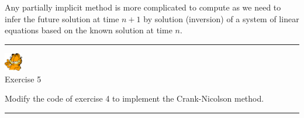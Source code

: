Any partially implicit method is more complicated to compute as we need to infer the future solution 
at time $n+1$ by solution (inversion) of a system of linear equations based on the known solution at time $n$. 

\begin{center}

\end{center}

\begin{center}
\begin{minipage}[t]{0.77\textwidth}
\par\noindent\rule{\textwidth}{0.4pt}

\begin{center}
\includegraphics[width=0.8cm]{images/garftr} \\
{\color{orange}Exercise 5}
\end{center}

Modify the code of exercise 4 to implement the Crank-Nicolson method.

\par\noindent\rule{\textwidth}{0.4pt}
\end{minipage}
\end{center}





